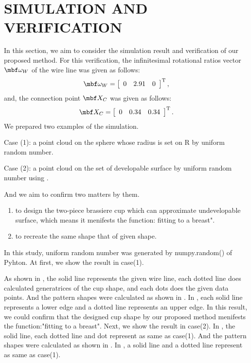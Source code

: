 \documentclass[E]{scitrans}
\begin{document}
\section*{SIMULATION AND VERIFICATION}
In this section, we aim to consider the simulation result and verification of our proposed method. For this verification, the inﬁnitesimal rotational ratios vector $ \mbold{\omega}_W $ of the wire line was given as follows:
\begin{equation}\label{eq:vrf_omgW}
\mbold{\omega}_W = \left[ \begin{array}{ccc}
0 & 2.91 & 0
\end{array}\right]^\mathrm{T}, 
\end{equation}
and, the connection point $ \mbold{X}_C $ was given as follows: 
\begin{equation}\label{eq:givenXc}
\mbold{X}_C = \left[ \begin{array}{ccc}
0 & 0.34 & 0.34
\end{array}\right]^\mathrm{T}.
\end{equation}
We prepared two examples of the simulation.

Case (1): a point cloud on the sphere whose radius is set on R by uniform random number. 

Case (2): a point cloud on the set of developable surface by uniform random number using . 

And we aim to confirm two matters by them.
\begin{enumerate}
	\item to design the two-piece brassiere cup which can approximate undevelopable surface, which means it menifests the function: fitting to a breast".
	\item to recreate the same shape that of given shape.
\end{enumerate}
In this study, uniform random number was generated by numpy.random() of Pyhton. At first, we show the result in case(1).

As shown in , the solid line represents the given wire line, each dotted line does calculated generatrices of the cup shape, and each dots does the given data points. And the pattern shapes were calculated as shown in . In , each solid line represents a lower edge and a dotted line represents an upper edge. In this result, we could confirm that the designed cup shape by our proposed method menifests the function:"fitting to a breast".
Next, we show the result in case(2). In , the solid line, each dotted line and dot represent as same as case(1). And the pattern shapes were calculated as shown in . In , a solid line and a dotted line represent as same as case(1).
\end{document}
